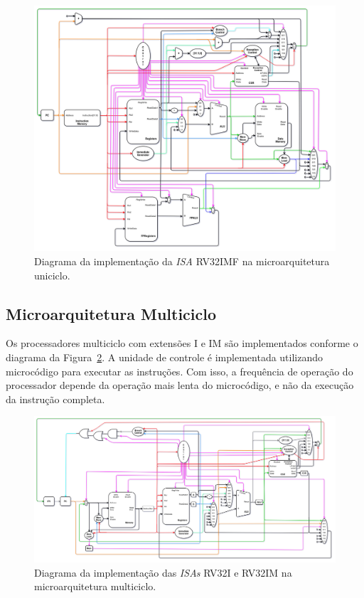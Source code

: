         \begin{figure}[H]
        \centering
            \includegraphics[width=1\linewidth]{../images/uarch_diagrams/singlecycle-RV32IMF.png}
            \caption{Diagrama da implementação da \textit{ISA} RV32IMF na
            microarquitetura uniciclo.}\label{fig:diagram_rv32imf_uni}
        \end{figure}

    \subsection{Microarquitetura Multiciclo}
        { Os processadores multiciclo com extensões I e IM são implementados
            conforme o diagrama da Figura~\ref{fig:diagram_rv32i_multi}. A
            unidade de controle é implementada utilizando microcódigo para
            executar as instruções. Com isso, a frequência de operação do
            processador depende da operação mais lenta do microcódigo, e não da
            execução da instrução completa.
        }

        \begin{figure}[H]
        \centering
            \includegraphics[width=1\linewidth]{../images/uarch_diagrams/multicycle-RV32I-RV32IM.png}
            \caption{Diagrama da implementação das \textit{ISAs} RV32I e RV32IM na
            microarquitetura multiciclo.}\label{fig:diagram_rv32i_multi}
        \end{figure}

